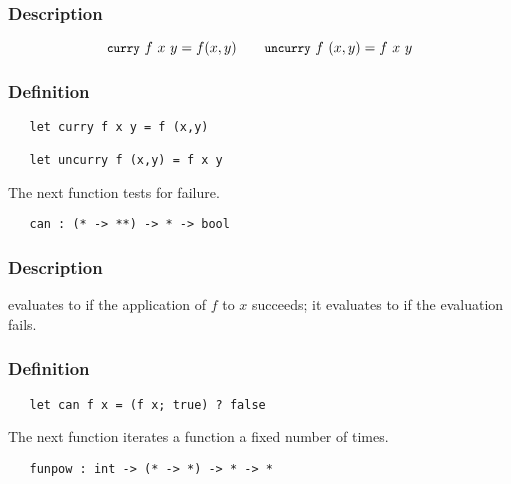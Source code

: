 \subsubsection*{Description}

\[ \ml{curry}\ f\ x\ y = f(x,y)\qquad \ml{uncurry}\ f\ (x,y) = f\ x\ y \]

\subsubsection*{Definition}

\begin{hol}\begin{verbatim}
   let curry f x y = f (x,y)

   let uncurry f (x,y) = f x y
\end{verbatim}\end{hol}


\noindent The next function tests for failure.

\begin{boxed}
\begin{verbatim}
   can : (* -> **) -> * -> bool
\end{verbatim}\end{boxed}

\subsubsection*{Description}

 evaluates to  if the application of $f$ to $x$
succeeds; it evaluates to  if the evaluation fails.

\subsubsection*{Definition}

\begin{hol}\begin{verbatim}
   let can f x = (f x; true) ? false
\end{verbatim}\end{hol}


\noindent The next function iterates a function a fixed number of times.

\begin{boxed}
\begin{verbatim}
   funpow : int -> (* -> *) -> * -> *
\end{verbatim}\end{boxed}

